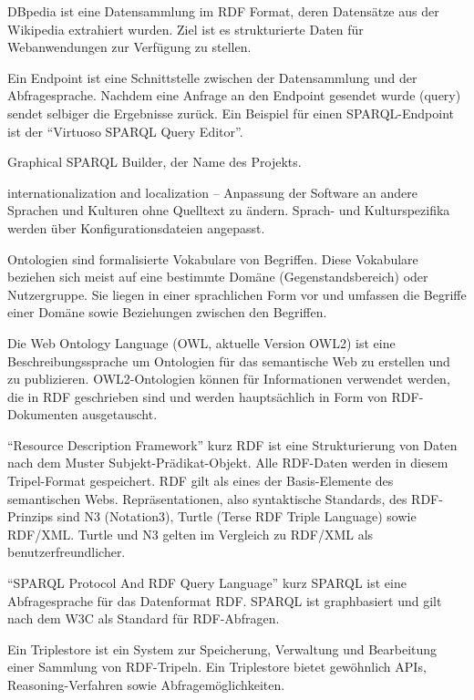 {DBpedia ist eine Datensammlung im RDF Format, deren Datensätze aus der Wikipedia extrahiert wurden. Ziel ist es strukturierte Daten für Webanwendungen zur Verfügung zu stellen.
\cite{dbpedia-wikipedia,dbpedia,dbpedia-datasets}
}

{Ein Endpoint ist eine Schnittstelle zwischen der Datensammlung und der 
Abfragesprache. Nachdem eine Anfrage an den Endpoint gesendet wurde (query)  sendet selbiger die Ergebnisse zurück. Ein Beispiel für einen SPARQL-Endpoint ist der “Virtuoso SPARQL Query Editor”. \cite{dbpedia-sparql}}

{Graphical SPARQL Builder, der Name des Projekts. \cite{swp14-gsb}}

{internationalization and localization -- Anpassung der Software an andere Sprachen und Kulturen ohne Quelltext zu ändern. Sprach- und Kulturspezifika werden über Konfigurationsdateien angepasst.}

{Ontologien sind formalisierte Vokabulare von Begriffen. Diese Vokabulare beziehen sich meist auf eine bestimmte Domäne (Gegenstandsbereich) oder Nutzergruppe. Sie liegen in einer sprachlichen Form vor und umfassen die Begriffe einer Domäne sowie Beziehungen zwischen den Begriffen. \cite{owl,ontologie-wiki,fraunhofer}
}

{Die Web Ontology Language (OWL, aktuelle Version OWL2) ist eine Beschreibungssprache um Ontologien für das semantische Web zu erstellen und zu publizieren. OWL2-Ontologien können für Informationen verwendet werden, die in RDF geschrieben sind und werden hauptsächlich in Form von RDF-Dokumenten ausgetauscht.
\cite{owl}
}

{“Resource Description Framework” kurz RDF ist eine Strukturierung von Daten nach
dem Muster Subjekt-Prädikat-Objekt. Alle RDF-Daten werden in diesem Tripel-Format 
gespeichert. RDF gilt als eines der Basis-Elemente des semantischen Webs.
Repräsentationen, also syntaktische Standards, des RDF-Prinzips sind N3 (Notation3), 
Turtle (Terse RDF Triple Language) sowie RDF/XML. Turtle und N3 gelten im Vergleich zu RDF/XML als benutzerfreundlicher. \cite{rdf-primer,rdf-wiki,rdf-xml-wiki}}

{“SPARQL Protocol And RDF Query Language” kurz SPARQL ist eine Abfragesprache für das Datenformat RDF. SPARQL ist graphbasiert und gilt nach dem W3C als Standard für RDF-Abfragen. \cite{w3c-rdf-sparql-query,sparql-wiki}}

{Ein Triplestore ist ein System zur Speicherung, Verwaltung und Bearbeitung einer
 Sammlung von RDF-Tripeln. Ein Triplestore bietet gewöhnlich APIs,
 Rea\-so\-ning-Verfahren sowie Abfragemöglichkeiten. \cite{fraunhofer}}

